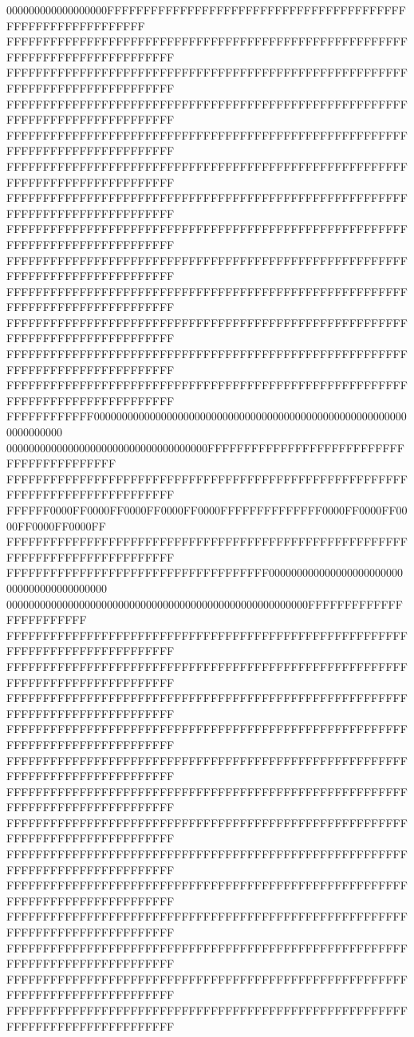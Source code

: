 000000000000000000FFFFFFFFFFFFFFFFFFFFFFFFFFFFFFFFFFFFFFFFFFFFFFFFFFFFFFFFFFFF
FFFFFFFFFFFFFFFFFFFFFFFFFFFFFFFFFFFFFFFFFFFFFFFFFFFFFFFFFFFFFFFFFFFFFFFFFFFFFF
FFFFFFFFFFFFFFFFFFFFFFFFFFFFFFFFFFFFFFFFFFFFFFFFFFFFFFFFFFFFFFFFFFFFFFFFFFFFFF
FFFFFFFFFFFFFFFFFFFFFFFFFFFFFFFFFFFFFFFFFFFFFFFFFFFFFFFFFFFFFFFFFFFFFFFFFFFFFF
FFFFFFFFFFFFFFFFFFFFFFFFFFFFFFFFFFFFFFFFFFFFFFFFFFFFFFFFFFFFFFFFFFFFFFFFFFFFFF
FFFFFFFFFFFFFFFFFFFFFFFFFFFFFFFFFFFFFFFFFFFFFFFFFFFFFFFFFFFFFFFFFFFFFFFFFFFFFF
FFFFFFFFFFFFFFFFFFFFFFFFFFFFFFFFFFFFFFFFFFFFFFFFFFFFFFFFFFFFFFFFFFFFFFFFFFFFFF
FFFFFFFFFFFFFFFFFFFFFFFFFFFFFFFFFFFFFFFFFFFFFFFFFFFFFFFFFFFFFFFFFFFFFFFFFFFFFF
FFFFFFFFFFFFFFFFFFFFFFFFFFFFFFFFFFFFFFFFFFFFFFFFFFFFFFFFFFFFFFFFFFFFFFFFFFFFFF
FFFFFFFFFFFFFFFFFFFFFFFFFFFFFFFFFFFFFFFFFFFFFFFFFFFFFFFFFFFFFFFFFFFFFFFFFFFFFF
FFFFFFFFFFFFFFFFFFFFFFFFFFFFFFFFFFFFFFFFFFFFFFFFFFFFFFFFFFFFFFFFFFFFFFFFFFFFFF
FFFFFFFFFFFFFFFFFFFFFFFFFFFFFFFFFFFFFFFFFFFFFFFFFFFFFFFFFFFFFFFFFFFFFFFFFFFFFF
FFFFFFFFFFFFFFFFFFFFFFFFFFFFFFFFFFFFFFFFFFFFFFFFFFFFFFFFFFFFFFFFFFFFFFFFFFFFFF
FFFFFFFFFFFF000000000000000000000000000000000000000000000000000000000000000000
000000000000000000000000000000000000FFFFFFFFFFFFFFFFFFFFFFFFFFFFFFFFFFFFFFFFFF
FFFFFFFFFFFFFFFFFFFFFFFFFFFFFFFFFFFFFFFFFFFFFFFFFFFFFFFFFFFFFFFFFFFFFFFFFFFFFF
FFFFFF0000FF0000FF0000FF0000FF0000FFFFFFFFFFFFFF0000FF0000FF0000FF0000FF0000FF
FFFFFFFFFFFFFFFFFFFFFFFFFFFFFFFFFFFFFFFFFFFFFFFFFFFFFFFFFFFFFFFFFFFFFFFFFFFFFF
FFFFFFFFFFFFFFFFFFFFFFFFFFFFFFFFFFFF000000000000000000000000000000000000000000
000000000000000000000000000000000000000000000000000000FFFFFFFFFFFFFFFFFFFFFFFF
FFFFFFFFFFFFFFFFFFFFFFFFFFFFFFFFFFFFFFFFFFFFFFFFFFFFFFFFFFFFFFFFFFFFFFFFFFFFFF
FFFFFFFFFFFFFFFFFFFFFFFFFFFFFFFFFFFFFFFFFFFFFFFFFFFFFFFFFFFFFFFFFFFFFFFFFFFFFF
FFFFFFFFFFFFFFFFFFFFFFFFFFFFFFFFFFFFFFFFFFFFFFFFFFFFFFFFFFFFFFFFFFFFFFFFFFFFFF
FFFFFFFFFFFFFFFFFFFFFFFFFFFFFFFFFFFFFFFFFFFFFFFFFFFFFFFFFFFFFFFFFFFFFFFFFFFFFF
FFFFFFFFFFFFFFFFFFFFFFFFFFFFFFFFFFFFFFFFFFFFFFFFFFFFFFFFFFFFFFFFFFFFFFFFFFFFFF
FFFFFFFFFFFFFFFFFFFFFFFFFFFFFFFFFFFFFFFFFFFFFFFFFFFFFFFFFFFFFFFFFFFFFFFFFFFFFF
FFFFFFFFFFFFFFFFFFFFFFFFFFFFFFFFFFFFFFFFFFFFFFFFFFFFFFFFFFFFFFFFFFFFFFFFFFFFFF
FFFFFFFFFFFFFFFFFFFFFFFFFFFFFFFFFFFFFFFFFFFFFFFFFFFFFFFFFFFFFFFFFFFFFFFFFFFFFF
FFFFFFFFFFFFFFFFFFFFFFFFFFFFFFFFFFFFFFFFFFFFFFFFFFFFFFFFFFFFFFFFFFFFFFFFFFFFFF
FFFFFFFFFFFFFFFFFFFFFFFFFFFFFFFFFFFFFFFFFFFFFFFFFFFFFFFFFFFFFFFFFFFFFFFFFFFFFF
FFFFFFFFFFFFFFFFFFFFFFFFFFFFFFFFFFFFFFFFFFFFFFFFFFFFFFFFFFFFFFFFFFFFFFFFFFFFFF
FFFFFFFFFFFFFFFFFFFFFFFFFFFFFFFFFFFFFFFFFFFFFFFFFFFFFFFFFFFFFFFFFFFFFFFFFFFFFF
FFFFFFFFFFFFFFFFFFFFFFFFFFFFFFFFFFFFFFFFFFFFFFFFFFFFFFFFFFFFFFFFFFFFFFFFFFFFFF
